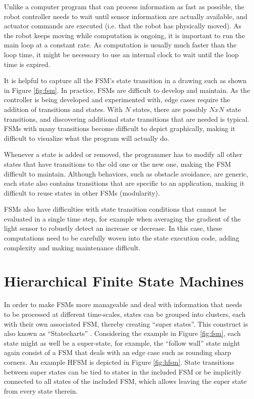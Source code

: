 Unlike a computer program that can process information as fast as possible, the robot controller needs to wait until sensor information are actually available, and actuator commands are executed (i.e. that the robot has physically moved). As the robot keeps moving while computation is ongoing, it is important to run the main loop at a constant rate. As computation is usually much faster than the loop time, it might be necessary to use an internal clock to wait until the loop time is expired.



It is helpful to capture all the FSM's state transition in a drawing such as shown in Figure \ref{fig:fsm}. In practice, FSMs are difficult to develop and maintain. As the controller is being developed and experimented with, edge cases require the addition of transitions and states. With $N$ states, there are possibly $NxN$ state transitions, and discovering additional state transitions that are needed is typical. FSMs with many transitions become difficult to depict graphically, making it difficult to visualize what the program will actually do. 

Whenever a state is added or removed, the programmer has to modify all other states that have transitions to the old one or the new one, making the FSM difficult to maintain. Although behaviors, such as obstacle avoidance, are generic, each state also contains transitions that are specific to an application, making it difficult to reuse states in other FSMs (modularity). 

FSMs also have difficulties with state transition conditions that cannot be evaluated in a single time step, for example when averaging the gradient of the light sensor to robustly detect an increase or decrease. In this case, these computations need to be carefully woven into the state execution code, adding complexity and making maintenance difficult. 


\section{Hierarchical Finite State Machines}\label{sec:stateflow}
In order to make FSMs more manageable and deal with information that needs to be processed at different time-scales, states can be grouped into clusters, each with their own associated FSM, thereby creating ``super states''. This construct is also known as ``Statecharts'' \cite{harel1987statecharts}. Considering the example in Figure \ref{fig:fsm}, each state might as well be a super-state, for example, the ``follow wall'' state might again consist of a FSM that deals with an edge case such as rounding sharp corners. An example HFSM is depicted in Figure \ref{fig:hfsm}. State transitions between super states can be tied to states in the included FSM or be implicitly connected to all states of the included FSM, which allows leaving the super state from every state therein.

